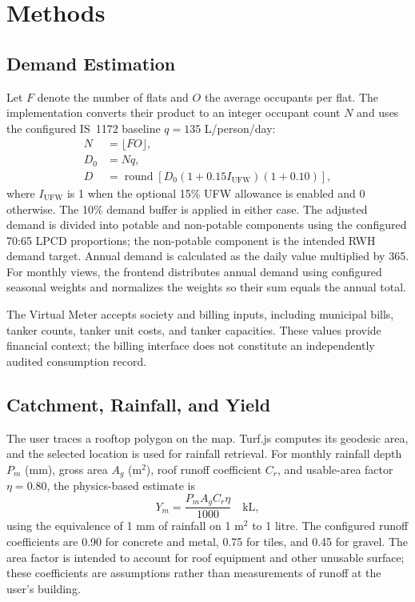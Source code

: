 \documentclass[conference]{IEEEtran}
\begin{document}
\section{Methods}
\label{sec:methods}

\subsection{Demand Estimation}
\label{sec:demand}

Let $F$ denote the number of flats and $O$ the average occupants per flat.
The implementation converts their product to an integer occupant count
$N$ and uses the configured IS~1172 baseline $q=135$ L/person/day:
\begin{align}
  N &= \lfloor F O \rfloor,\\
  D_0 &= N q,\\
  D &= \operatorname{round}\!\left[
      D_0(1 + 0.15 I_{\mathrm{UFW}})(1 + 0.10)
      \right],
  \label{eq:demand}
\end{align}
where $I_{\mathrm{UFW}}$ is 1 when the optional 15\% UFW allowance is
enabled and 0 otherwise. The 10\% demand buffer is applied in either
case. The adjusted demand is divided into potable and non-potable
components using the configured 70:65 LPCD proportions; the non-potable
component is the intended RWH demand target. Annual demand is calculated
as the daily value multiplied by 365. For monthly views, the frontend
distributes annual demand using configured seasonal weights and
normalizes the weights so their sum equals the annual total.

The Virtual Meter accepts society and billing inputs, including
municipal bills, tanker counts, tanker unit costs, and tanker capacities.
These values provide financial context; the billing interface does not
constitute an independently audited consumption record.

\subsection{Catchment, Rainfall, and Yield}
\label{sec:yield}

The user traces a rooftop polygon on the map. Turf.js computes its
geodesic area, and the selected location is used for rainfall retrieval.
For monthly rainfall depth $P_m$ (mm), gross area $A_g$ (m$^2$), roof
runoff coefficient $C_r$, and usable-area factor $\eta=0.80$, the
physics-based estimate is
\begin{equation}
  Y_m = \frac{P_m A_g C_r \eta}{1000}
  \quad \mathrm{kL},
  \label{eq:yield}
\end{equation}
using the equivalence of 1 mm of rainfall on 1 m$^2$ to 1 litre. The
configured runoff coefficients are 0.90 for concrete and metal, 0.75 for
tiles, and 0.45 for gravel. The area factor is intended to account for
roof equipment and other unusable surface; these coefficients are
assumptions rather than measurements of runoff at the user's building.
\end{document}
